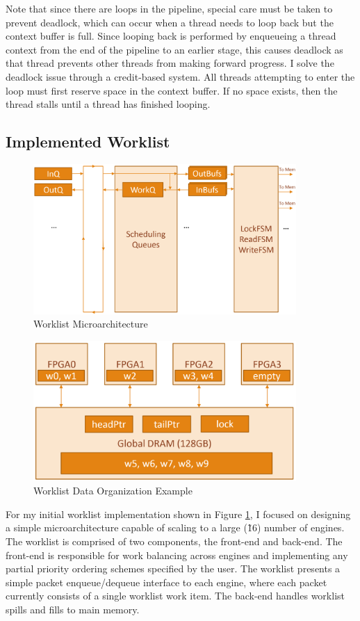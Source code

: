 Note that since there are loops in the pipeline, special care must be taken to prevent deadlock, which can occur when 
a thread needs to loop back but the context buffer is full. Since looping back is performed by enqueueing a thread 
context from the end of the pipeline to an earlier stage, this causes deadlock as that thread prevents other threads 
from making forward progress. I solve the deadlock issue through a credit-based system. All threads attempting to 
enter the loop must first reserve space in the context buffer. If no space exists, then the thread stalls until a 
thread has finished looping.

\subsection{Implemented Worklist}

\begin{figure}
\centering
\includegraphics[width=10cm, keepaspectratio]{pics/worklist.png}
\caption{Worklist Microarchitecture}
\label{fig:worklist}
\end{figure}

\begin{figure}
\centering
\includegraphics[width=10cm, keepaspectratio]{pics/worklistMem.png}
\caption{Worklist Data Organization Example}
\label{fig:worklistMem}
\end{figure}

For my initial worklist implementation shown in Figure \ref{fig:worklist}, I focused on designing a simple 
microarchitecture capable of scaling to a large (\~16) number of engines. The worklist is comprised of two components, 
the front-end and back-end. The front-end is responsible for work balancing across engines and implementing any 
partial priority ordering schemes specified by the user. The worklist presents a simple packet enqueue/dequeue 
interface to each engine, where each packet currently consists of a single worklist work item. The back-end handles 
worklist spills and fills to main memory.


